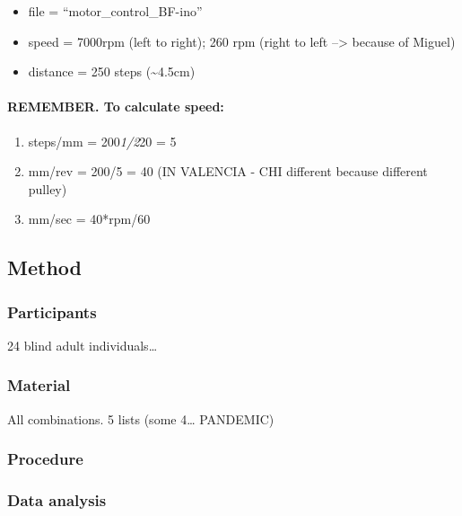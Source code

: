 \documentclass[
  english,
  man]{apa7}
\providecommand{\tightlist}{%
  \setlength{\itemsep}{0pt}\setlength{\parskip}{0pt}}
\let\oldparagraph\paragraph
\renewcommand{\paragraph}[1]{\oldparagraph{#1}\mbox{}}
\begin{document}
\begin{itemize}
\tightlist
\item
  file = ``motor\_control\_BF-ino''
\item
  speed = 7000rpm (left to right); 260 rpm (right to left --\textgreater{} because of Miguel)
\item
  distance = 250 steps (\textasciitilde4.5cm)
\end{itemize}

\hypertarget{remember.-to-calculate-speed}{%
\paragraph{REMEMBER. To calculate speed:}\label{remember.-to-calculate-speed}}

\begin{enumerate}
\def\labelenumi{\arabic{enumi}.}
\tightlist
\item
  steps/mm = 200\emph{1/2}20 = 5
\item
  mm/rev = 200/5 = 40 (IN VALENCIA - CHI different because different pulley)
\item
  mm/sec = 40*rpm/60
\end{enumerate}

\hypertarget{method-1}{%
\subsection{Method}\label{method-1}}

\hypertarget{participants-1}{%
\subsubsection{Participants}\label{participants-1}}

24 blind adult individuals\ldots{}

\hypertarget{material}{%
\subsubsection{Material}\label{material}}

All combinations. 5 lists (some 4\ldots{} PANDEMIC)

\hypertarget{procedure-1}{%
\subsubsection{Procedure}\label{procedure-1}}

\hypertarget{data-analysis-1}{%
\subsubsection{Data analysis}\label{data-analysis-1}}
\end{document}
